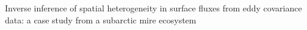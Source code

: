 Inverse inference of spatial heterogeneity in surface fluxes from eddy
covariance data: a case study from a subarctic mire ecosystem